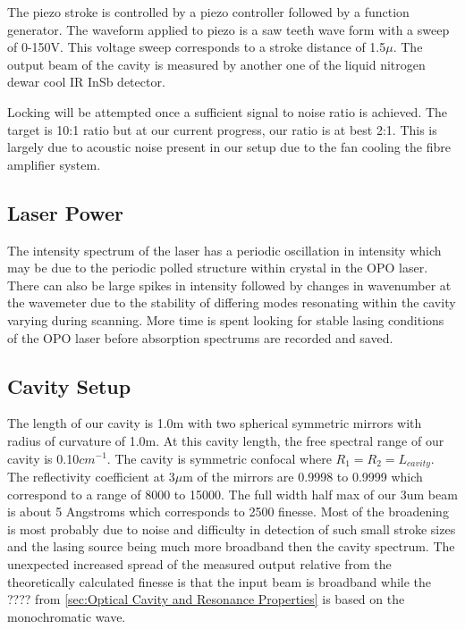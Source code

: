 \documentclass[11pt,a4paper]{book}
\begin{document}
		The piezo stroke is controlled by a piezo controller followed by a function generator. The waveform applied to piezo is a saw teeth wave form with a sweep of 0-150V. This voltage sweep corresponds to a stroke distance of 1.5$\mu$. The output beam of the cavity is measured by another one of the liquid nitrogen dewar cool IR InSb detector. 
		
		Locking will be attempted once a sufficient signal to noise ratio is achieved. The target is 10:1 ratio but at our current progress, our ratio is at best 2:1. This is largely due to acoustic noise present in our setup due to the fan cooling the fibre amplifier system.

		\subsection{Laser Power}
			\label{subsection:Laser Power}
			The intensity spectrum of the laser has a periodic oscillation in intensity which may be due to the periodic polled structure within crystal in the OPO laser. There can also be large spikes in intensity followed by changes in wavenumber at the wavemeter due to the stability of differing modes resonating within the cavity varying during scanning. More time is spent looking for stable lasing conditions of the OPO laser before absorption spectrums are recorded and saved.
			
		\subsection{Cavity Setup}
			\label{subsection:Cavity Setup}
			The length of our cavity is 1.0m with two spherical symmetric mirrors with radius of curvature of 1.0m. At this cavity length, the free spectral range of our cavity is 0.10$cm^{-1}$. The cavity is symmetric confocal where $R_1=R_2=L_{cavity}$. The reflectivity coefficient at 3$\mu$m of the mirrors are 0.9998 to 0.9999 which correspond to a range of 8000 to 15000. The full width half max of our 3um beam is about 5 Angstroms which corresponds to 2500 finesse. Most of the broadening is most probably due to noise and difficulty in detection of such small stroke sizes and the lasing source being much more broadband then the cavity spectrum. The unexpected increased spread of the measured output relative from the theoretically calculated finesse is that the input beam is broadband while the ???? from \autoref{sec:Optical Cavity and Resonance Properties} is based on the monochromatic wave.
\end{document}
